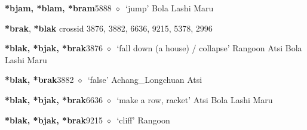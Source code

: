   \begin{list}{}{\leftmargin=1.5em \itemindent=-1.5em}
  \item {\footnotesize \textbf{*bjam, *blam, *bram}}{\tiny 5888}
         $\diamond$~`jump'
         Bola 
\hspace{1ex}
         Lashi 
\hspace{1ex}
         Maru 
  \end{list}
\item
\textbf{*brak}, \textbf{*blak}
  {\tiny crossid 3876, 3882, 6636, 9215, 5378, 2996}
  \begin{list}{}{\leftmargin=1.5em \itemindent=-1.5em}
  \item {\footnotesize \textbf{*blak, *bjak, *brak}}{\tiny 3876}
         $\diamond$~`fall down (a house) / collapse'
         Rangoon 
\hspace{1ex}
         Atsi 
\hspace{1ex}
         Bola 
\hspace{1ex}
         Lashi 
\hspace{1ex}
         Maru 
  \item {\footnotesize \textbf{*blak, *brak}}{\tiny 3882}
\hspace{1ex}
         $\diamond$~`false'
         Achang\_Longchuan 
\hspace{1ex}
         Atsi 
  \item {\footnotesize \textbf{*blak, *bjak, *brak}}{\tiny 6636}
\hspace{1ex}
         $\diamond$~`make a row, racket'
         Atsi 
\hspace{1ex}
         Bola 
\hspace{1ex}
         Lashi 
\hspace{1ex}
         Maru 
  \item {\footnotesize \textbf{*blak, *bjak, *brak}}{\tiny 9215}
\hspace{1ex}
         $\diamond$~`cliff'
         Rangoon 
\hspace{1ex}

\end{list}
